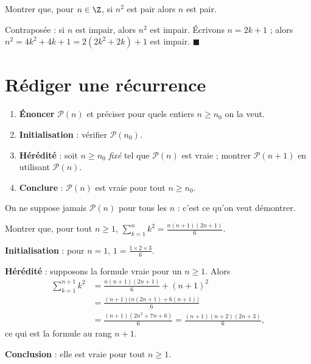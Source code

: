 \begin{exemple}[Contraposée]
Montrer que, pour $n\in\Z$, si $n^2$ est pair alors $n$ est pair.

Contraposée : si $n$ est impair, alors $n^2$ est impair. Écrivons $n=2k+1$ ; alors $n^2=4k^2+4k+1=2(2k^2+2k)+1$ est impair. $\blacksquare$
\end{exemple}

\section{Rédiger une récurrence}

\begin{methode}
\begin{enumerate}[label=\textbf{Étape \arabic*.}]
  \item \textbf{Énoncer} $\mathcal P(n)$ et préciser pour quels entiers $n\ge n_0$ on la veut.
  \item \textbf{Initialisation} : vérifier $\mathcal P(n_0)$.
  \item \textbf{Hérédité} : soit $n\ge n_0$ \emph{fixé} tel que $\mathcal P(n)$ est vraie ; montrer $\mathcal P(n+1)$ en utilisant $\mathcal P(n)$.
  \item \textbf{Conclure} : $\mathcal P(n)$ est vraie pour tout $n\ge n_0$.
\end{enumerate}
\end{methode}

\begin{attention}
On ne suppose jamais $\mathcal P(n)$ pour tous les $n$ : c'est ce qu'on veut démontrer.
\end{attention}

\begin{exercice}[Application]
Montrer que, pour tout $n\ge1$, $\displaystyle\sum_{k=1}^{n}k^2=\frac{n(n+1)(2n+1)}{6}$.
\begin{correction}
\textbf{Initialisation} : pour $n=1$, $1=\frac{1\times2\times3}{6}$.

\textbf{Hérédité} : supposons la formule vraie pour un $n\ge1$. Alors
\begin{align*}
\sum_{k=1}^{n+1}k^2 &= \frac{n(n+1)(2n+1)}{6}+(n+1)^2\\
&= \frac{(n+1)\big(n(2n+1)+6(n+1)\big)}{6}\\
&= \frac{(n+1)(2n^2+7n+6)}{6}=\frac{(n+1)(n+2)(2n+3)}{6},
\end{align*}
ce qui est la formule au rang $n+1$.

\textbf{Conclusion} : elle est vraie pour tout $n\ge1$.
\end{correction}
\end{exercice}

